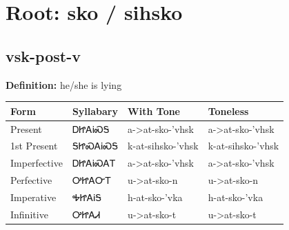 \documentclass{article}%
\begin{document}
%
\normalsize%
\section*{Root: sko / sihsko}%
\subsection*{vsk-post-v}%
\textbf{Definition: }%
he/she is lying%
\\[0.5em]%
\begin{tabular}{|l|l|l|l|}%
\hline%
\textbf{Form}&\textbf{Syllabary}&\textbf{With Tone}&\textbf{Toneless}\\%
\hline%
Present&ᎠᏥᎪᎥᏍᎦ&a{-}>at{-}sko{-}'vhsk&a{-}>at{-}sko{-}'vhsk\\%
1st Present&ᎦᏥᏍᎪᎥᏍᎦ&k{-}at{-}sihsko{-}'vhsk&k{-}at{-}sihsko{-}'vhsk\\%
Imperfective&ᎠᏥᎪᎥᏍᎪᎢ&a{-}>at{-}sko{-}'vhsk&a{-}>at{-}sko{-}'vhsk\\%
Perfective&ᎤᏥᎪᏅᎢ&u{-}>at{-}sko{-}n&u{-}>at{-}sko{-}n\\%
Imperative&ᎭᏥᎪᎥᎦ&h{-}at{-}sko{-}'vka&h{-}at{-}sko{-}'vka\\%
Infinitive&ᎤᏥᎪᏗ&u{-}>at{-}sko{-}t&u{-}>at{-}sko{-}t\\%
\hline%
\end{tabular}%
\\[1em]%
\end{document}
